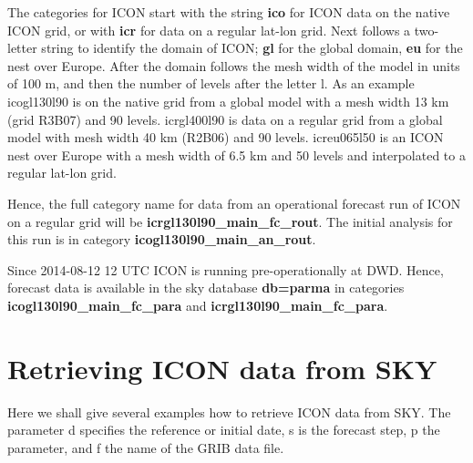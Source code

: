The categories for ICON start with the string \textbf{ico} for ICON data on the native
ICON grid, or with \textbf{icr} for data on a regular lat-lon grid.
Next follows a two-letter string to identify the domain of ICON; \textbf{gl} for the
global domain, \textbf{eu} for the nest over Europe. After the domain follows the
mesh width of the model in units of 100 m, and then the number of levels after the
letter l. As an example icogl130l90 is on the native grid from a global model with a mesh width
13 km (grid R3B07) and 90 levels. icrgl400l90 is data on a regular grid from a global model with
mesh width 40 km (R2B06) and 90 levels. icreu065l50 is an ICON nest over Europe with a
mesh width of 6.5 km and 50 levels and interpolated to a regular lat-lon grid.

Hence, the full category name for data from an operational forecast run of ICON on a
regular grid will be \textbf{icrgl130l90\_main\_fc\_rout}. The initial analysis for this
run is in category \textbf{icogl130l90\_main\_an\_rout}.

Since 2014-08-12 12 UTC ICON is running pre-operationally at DWD. Hence, forecast data
is available in the sky database \textbf{db=parma} in categories
\textbf{icogl130l90\_main\_fc\_para} and \textbf{icrgl130l90\_main\_fc\_para}.

\section{Retrieving ICON data from SKY}

Here we shall give several examples how to retrieve ICON data from SKY.
The parameter d specifies the reference or initial date, s is the forecast step, p the parameter,
and f the name of the GRIB data file.

